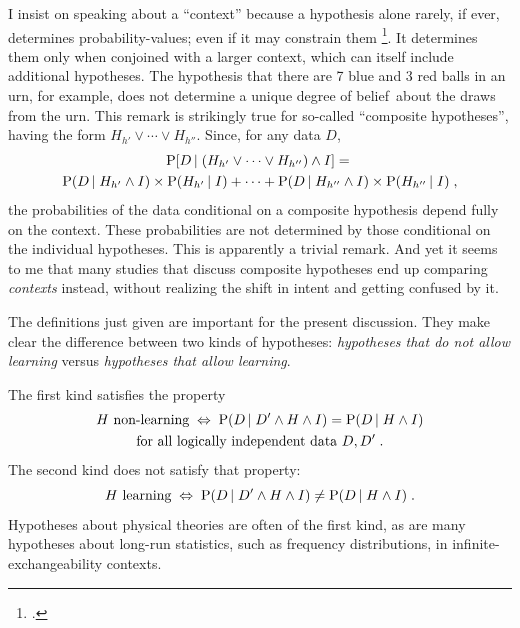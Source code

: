\documentclass[\ifafour a4paper,12pt,\else a5paper,10pt,\fi%
onecolumn,oneside,article,%
british%
]{memoir}
\theoremstyle{remark}
\theoremstyle{innote}
\newcommand*{\citep}{\footcites}
\newcommand*{\p}{\mathrm{P}}%
\renewcommand*{\|}[1][]{\nonscript\,#1\vert\nonscript\;\mathopen{}}
\newcommand*{\dob}{degree of belief}
\newcommand*{\yK}{I}
\newcommand*{\liff}{\mathrel{\;\Leftrightarrow\;}}
\begin{document}
I insist on speaking about a \enquote{context} because a hypothesis alone
rarely, if ever, determines probability-values; even if it may constrain
them \citep{hailperin2011}. It determines them only when conjoined with a
larger context, which can itself include additional hypotheses. The
hypothesis that there are 7 blue and 3 red balls in an urn, for example,
does not determine a unique \dob\ about the draws from the urn. This remark
is strikingly true for so-called \enquote{composite hypotheses}, having the
form $H_{h'} \lor \dotsb \lor H_{h''}$. Since, for any data $D$,
\begin{multline}
  \label{eq:comp_hyp}
  \p[ D \| (H_{h'} \lor \dotsb \lor H_{h''} ) \land \yK]
  ={}\\
 \p( D \| H_{h'} \land \yK) \times \p(H_{h'} \| \yK) +
  \dotsb +
 \p( D \| H_{h''} \land \yK) \times \p(H_{h''} \| \yK) \;,
\end{multline}
the probabilities of the data conditional on a composite hypothesis depend
fully on the context. These probabilities are not determined by those
conditional on the individual hypotheses. This is apparently a trivial
remark. And yet it seems to me that many studies that discuss composite
hypotheses end up comparing \emph{contexts} instead, without realizing the
shift in intent and getting confused by it.

The definitions just given are important for the present discussion. They
make clear the difference between two kinds of hypotheses: \emph{hypotheses
  that do not allow learning} versus \emph{hypotheses that allow learning}.

The first kind satisfies the property
\begin{multline}
  \label{eq:nonlearning_hyp}
\text{$H$ non-learning} \liff  \p( D \| D' \land H \land \yK) = 
\p( D \| H \land \yK)
\\\text{for all logically independent data $D, D'$}\;.
\end{multline}
The second kind does not satisfy that property:
\begin{equation}
  \label{eq:learning_hyp}
\text{$H$ learning} \liff  \p( D \| D' \land H \land \yK) \ne 
  \p( D \| H \land \yK) \;.
\end{equation}
Hypotheses about physical theories are often of the first kind, as are
many hypotheses about long-run statistics, such as frequency distributions, in
infinite-exchangeability contexts.
\end{document}
